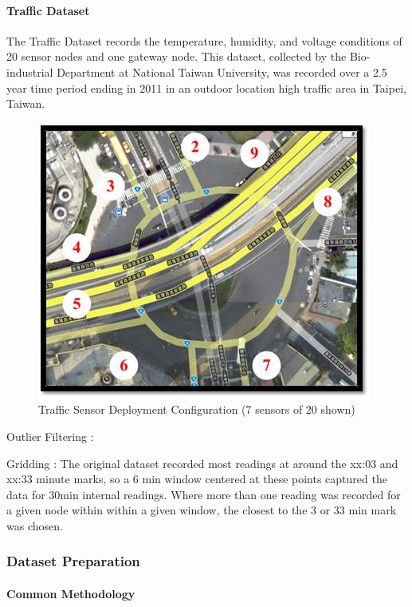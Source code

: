 \paragraph*{Traffic Dataset}

The Traffic Dataset records the temperature, humidity, and voltage conditions of 20 sensor nodes and one gateway node.
This dataset, collected by the Bio-industrial Department at National Taiwan University, was recorded over a 2.5 year time period ending in 2011 in an outdoor location high traffic area in Taipei, Taiwan.

\begin{figure}[H]
\centering
\includegraphics[scale=0.5]{traffic_wsn.png}
\caption{Traffic Sensor Deployment Configuration (7 sensors of 20 shown)}
\end{figure}

Outlier Filtering : 

Gridding : The original dataset recorded most readings at around the xx:03 and xx:33 minute marks, so a 6 min window centered at
these points captured the data for 30min internal readings. Where more than one reading was recorded for a given node
within within a given window, the closest to the 3 or 33 min mark was chosen.

\subsubsection{Dataset Preparation}

\paragraph*{Common Methodology}

